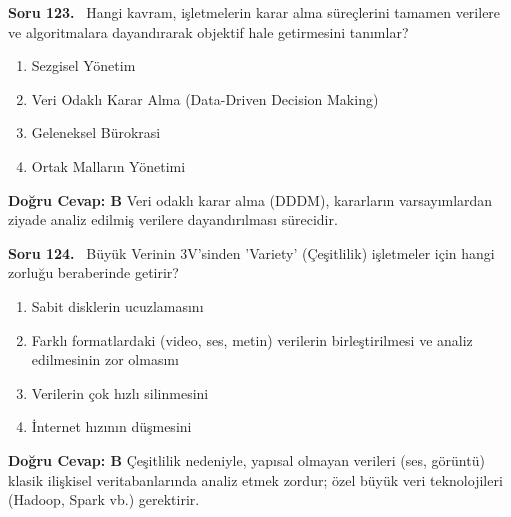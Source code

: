 \documentclass[11pt,a4paper,openany]{book}
\begin{document}
\needspace{5cm}
\vspace{8pt}
\noindent\textbf{\large\sffamily Soru 123.} \ Hangi kavram, işletmelerin karar alma süreçlerini tamamen verilere ve algoritmalara dayandırarak objektif hale getirmesini tanımlar?
\begin{enumerate}[label=\Alph*), leftmargin=25pt, topsep=4pt, itemsep=2pt]
    \item Sezgisel Yönetim
    \item Veri Odaklı Karar Alma (Data-Driven Decision Making)
    \item Geleneksel Bürokrasi
    \item Ortak Malların Yönetimi
\end{enumerate}
\vspace{4pt}
\begin{tcolorbox}[title=Cevap ve Açıklama, colback=gray!3!white, colframe=primarycolor!90!black, arc=2mm, fonttitle=\bfseries\sffamily, top=6pt, bottom=6pt]
    \textbf{Doğru Cevap: B}
    \vspace{2pt}
    Veri odaklı karar alma (DDDM), kararların varsayımlardan ziyade analiz edilmiş verilere dayandırılması sürecidir.
\end{tcolorbox}
\vspace{10pt}

\needspace{5cm}
\vspace{8pt}
\noindent\textbf{\large\sffamily Soru 124.} \ Büyük Verinin 3V'sinden 'Variety' (Çeşitlilik) işletmeler için hangi zorluğu beraberinde getirir?
\begin{enumerate}[label=\Alph*), leftmargin=25pt, topsep=4pt, itemsep=2pt]
    \item Sabit disklerin ucuzlamasını
    \item Farklı formatlardaki (video, ses, metin) verilerin birleştirilmesi ve analiz edilmesinin zor olmasını
    \item Verilerin çok hızlı silinmesini
    \item İnternet hızının düşmesini
\end{enumerate}
\vspace{4pt}
\begin{tcolorbox}[title=Cevap ve Açıklama, colback=gray!3!white, colframe=primarycolor!90!black, arc=2mm, fonttitle=\bfseries\sffamily, top=6pt, bottom=6pt]
    \textbf{Doğru Cevap: B}
    \vspace{2pt}
    Çeşitlilik nedeniyle, yapısal olmayan verileri (ses, görüntü) klasik ilişkisel veritabanlarında analiz etmek zordur; özel büyük veri teknolojileri (Hadoop, Spark vb.) gerektirir.
\end{tcolorbox}
\vspace{10pt}
\end{document}
